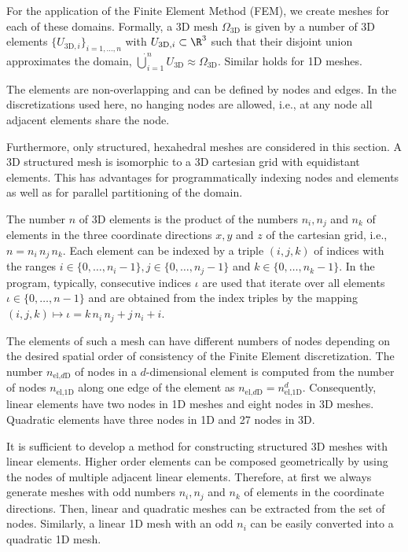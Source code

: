 For the application of the Finite Element Method (FEM), we create meshes for each of these domains. Formally, a 3D mesh $\Omega_\text{3D}$ is given by a number of 3D elements $\{U_{\text{3D},i}\}_{i=1,\dots,n}$ with $U_{\text{3D},i} \subset \R^3$ such that their disjoint union approximates the domain,
$\dot{\bigcup}_{i=1}^{n} U_\text{3D} \approx \Omega_\text{3D}$. Similar holds for 1D meshes.

The elements are non-overlapping and can be defined by nodes and edges. In the discretizations used here, no hanging nodes are allowed, i.e., at any node all adjacent elements share the node.

Furthermore, only structured, hexahedral meshes are considered in this section.
A 3D structured mesh is isomorphic to a 3D cartesian grid with equidistant elements. 
This has advantages for programmatically indexing nodes and elements as well as for parallel partitioning of the domain.

The number $n$ of 3D elements is the product of the numbers $n_i, n_j$ and $n_k$ of elements in the three coordinate directions $x,y$ and $z$ of the cartesian grid,
 i.e., $n = n_i\,n_j\, n_k$.
Each element can be indexed by a triple $(i,j,k)$ of indices with the ranges $i \in \{0,\dots,n_i-1\}, j \in \{0,\dots, n_j-1\}$ and $k \in \{0,\dots,n_k-1\}$. 
In the program, typically, consecutive indices $\iota$ are used that iterate over all elements $\iota \in \{0,\dots,n-1\}$ and are obtained from the index triples by the mapping 
$(i,j,k) \mapsto \iota = k\,n_i\,n_j + j\,n_i + i$.

The elements of such a mesh can have different numbers of nodes depending on the desired spatial order of consistency of the Finite Element discretization. The number $n_{\text{el,}d\text{D}}$ of nodes in a $d$-dimensional element is computed from the number of nodes $n_{\text{el,1D}}$ along one edge of the element as $n_{\text{el,}d\text{D}} = n_{\text{el,1D}}^d$.
Consequently, linear elements have two nodes in 1D meshes and eight nodes in 3D meshes. Quadratic elements have three nodes in 1D and 27 nodes in 3D.

It is sufficient to develop a method for constructing structured 3D meshes with linear elements. 
Higher order elements can be composed geometrically by using the nodes of multiple adjacent linear elements.
Therefore, at first we always generate meshes with odd numbers $n_i,n_j$ and $n_k$ of elements in the coordinate directions. Then, linear and quadratic meshes can be extracted from the set of nodes. Similarly, a linear 1D mesh with an odd $n_i$ can be easily converted into a quadratic 1D mesh.

